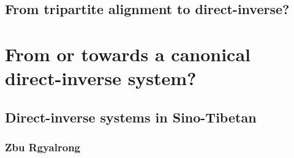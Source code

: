 \documentclass[twoside,a4paper,11pt]{article}
\newcommand{\Σ}{\greek{Σ}}
\begin{document}
\subsection{From tripartite alignment to direct-inverse?}

\section{From or towards a canonical direct-inverse system?}

\subsection{Direct-inverse systems in Sino-Tibetan}

\subsubsection{Zbu Rgyalrong}
\end{document}
